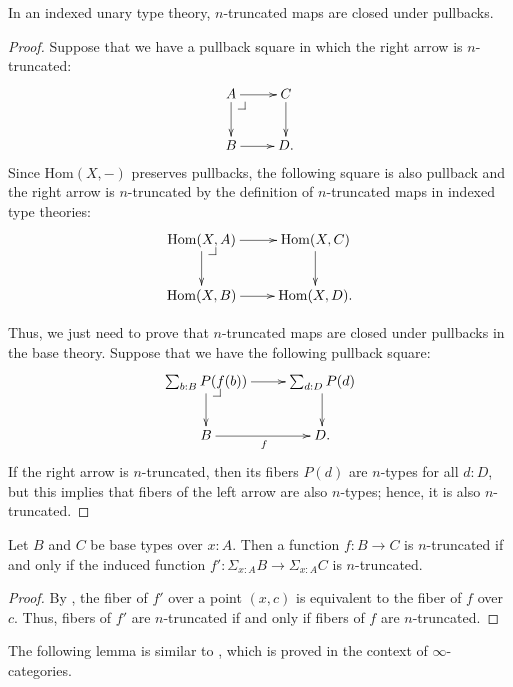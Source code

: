 \documentclass[reqno]{amsart}
\makeatletter
\theoremstyle{definition}
\theoremstyle{remark}
\newcommand{\fs}[1]{\mathrm{#1}}
\newcommand{\Hom}{\fs{Hom}}
\numberwithin{figure}{section}
\newcommand{\pb}[1][dr]{\save*!/#1-1.2pc/#1:(-1,1)@^{|-}\restore}
\makeatother
\begin{document}
\begin{lem}[trunc-pb]
In an indexed unary type theory, $n$-truncated maps are closed under pullbacks.
\end{lem}
\begin{proof}
Suppose that we have a pullback square in which the right arrow is $n$-truncated:
\[ \xymatrix{ A \ar[r] \ar[d] \pb   & C \ar[d] \\
              B \ar[r]              & D.
            } \]
Since $\Hom(X,-)$ preserves pullbacks, the following square is also pullback and the right arrow is $n$-truncated by the definition of $n$-truncated maps in indexed type theories:
\[ \xymatrix{ \Hom(X,A) \ar[r] \ar[d] \pb   & \Hom(X,C) \ar[d] \\
              \Hom(X,B) \ar[r]              & \Hom(X,D).
            } \]

Thus, we just need to prove that $n$-truncated maps are closed under pullbacks in the base theory.
Suppose that we have the following pullback square:
\[ \xymatrix{ \sum_{b : B} P(f(b)) \ar[r] \ar[d] \pb    & \sum_{d : D} P(d) \ar[d] \\
              B \ar[r]_f                                & D.
            } \]
If the right arrow is $n$-truncated, then its fibers $P(d)$ are $n$-types for all $d : D$, but this implies that fibers of the left arrow are also $n$-types; hence, it is also $n$-truncated.
\end{proof}

\begin{lem}
Let $B$ and $C$ be base types over $x : A$.
Then a function $f : B \to C$ is $n$-truncated if and only if the induced function $f' : \Sigma_{x : A} B \to \Sigma_{x : A} C$ is $n$-truncated.
\end{lem}
\begin{proof}
By \cite[Theorem~4.7.6]{hottbook}, the fiber of $f'$ over a point $(x,c)$ is equivalent to the fiber of $f$ over $c$.
Thus, fibers of $f'$ are $n$-truncated if and only if fibers of $f$ are $n$-truncated.
\end{proof}

The following lemma is similar to \cite[5.5.6.15]{lurie-topos}, which is proved in the context of $\infty$-categories.
\end{document}
